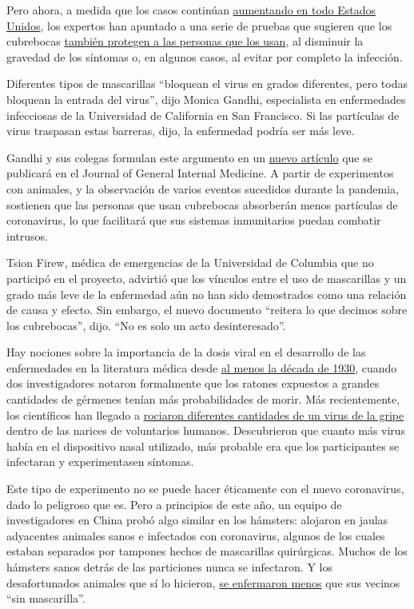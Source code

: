 Pero ahora, a medida que los casos continúan
\href{https://www.nytimes3xbfgragh.onion/es/interactive/2020/espanol/mundo/coronavirus-en-estados-unidos.html}{aumentando
en todo Estados Unidos}, los expertos han apuntado a una serie de
pruebas que sugieren que los cubrebocas
\href{https://pubmed.ncbi.nlm.nih.gov/23498357/}{también protegen a las
personas que los usan}, al disminuir la gravedad de los síntomas o, en
algunos casos, al evitar por completo la infección.

Diferentes tipos de mascarillas ``bloquean el virus en grados
diferentes, pero todas bloquean la entrada del virus'', dijo Monica
Gandhi, especialista en enfermedades infecciosas de la Universidad de
California en San Francisco. Si las partículas de virus traspasan estas
barreras, dijo, la enfermedad podría ser más leve.

Gandhi y sus colegas formulan este argumento en un
\href{https://ucsf.app.box.com/s/blvolkp5z0mydzd82rjks4wyleagt036}{nuevo
artículo} que se publicará en el Journal of General Internal Medicine. A
partir de experimentos con animales, y la observación de varios eventos
sucedidos durante la pandemia, sostienen que las personas que usan
cubrebocas absorberán menos partículas de coronavirus, lo que facilitará
que sus sistemas inmunitarios puedan combatir intrusos.

Tsion Firew, médica de emergencias de la Universidad de Columbia que no
participó en el proyecto, advirtió que los vínculos entre el uso de
mascarillas y un grado más leve de la enfermedad aún no han sido
demostrados como una relación de causa y efecto. Sin embargo, el nuevo
documento ``reitera lo que decimos sobre los cubrebocas'', dijo. ``No es
solo un acto desinteresado''.

Hay nociones sobre la importancia de la dosis viral en el desarrollo de
las enfermedades en la literatura médica desde
\href{https://academic.oup.com/aje/article-abstract/27/3/493/99616}{al
menos la década de 1930}, cuando dos investigadores notaron formalmente
que los ratones expuestos a grandes cantidades de gérmenes tenían más
probabilidades de morir. Más recientemente, los científicos han llegado
a \href{https://pubmed.ncbi.nlm.nih.gov/25416753/}{rociaron diferentes
cantidades de un virus de la gripe} dentro de las narices de voluntarios
humanos. Descubrieron que cuanto más virus había en el dispositivo nasal
utilizado, más probable era que los participantes se infectaran y
experimentasen síntomas.

Este tipo de experimento no se puede hacer éticamente con el nuevo
coronavirus, dado lo peligroso que es. Pero a principios de este año, un
equipo de investigadores en China probó algo similar en los hámsters:
alojaron en jaulas adyacentes animales sanos e infectados con
coronavirus, algunos de los cuales estaban separados por tampones hechos
de mascarillas quirúrgicas. Muchos de los hámsters sanos detrás de las
particiones nunca se infectaron. Y los desafortunados animales que sí lo
hicieron,
\href{https://academic.oup.com/cid/article/doi/10.1093/cid/ciaa644/5848814}{se
enfermaron menos} que sus vecinos ``sin mascarilla''.

